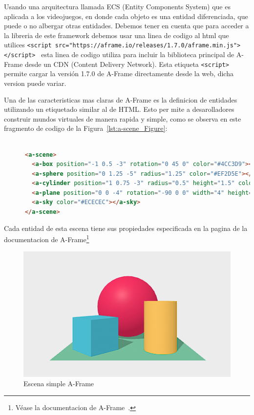 \documentclass[a4paper, 12pt]{book}
\begin{document}
Usando una arquitectura llamada ECS (Entity Components System) que es aplicada a los videojuegos, en donde cada objeto es una entidad diferenciada, que puede o no albergar otras entidades. Debemos tener en cuenta que para acceder a la libreria de este framework debemos usar una linea de codigo al html que utilices \texttt{<script src="https://aframe.io/releases/1.7.0/aframe.min.js"></script>
}
esta linea de codigo utiliza para incluir la biblioteca principal de A-Frame desde un CDN (Content Delivery Network). Esta etiqueta \texttt{<script>} permite cargar la versión 1.7.0 de A-Frame directamente desde la web, dicha version puede variar.

Una de las caracteristicas mas claras de A-Frame es la definicion de entidades utilizando un etiquetado similar al de HTML. Esto per mite a desarolladores construir mundos virtuales de manera rapida y simple, como se observa en este fragmento de codigo de la Figura~\ref{lst:a-scene_Figure}: 

\begin{lstlisting}[language=HTML, caption=Escena A-Frame básica, captionpos=b,label=lst:a-scene_Figure]

      <a-scene>
        <a-box position="-1 0.5 -3" rotation="0 45 0" color="#4CC3D9"></a-box>
        <a-sphere position="0 1.25 -5" radius="1.25" color="#EF2D5E"></a-sphere>
        <a-cylinder position="1 0.75 -3" radius="0.5" height="1.5" color="#FFC65D"></a-cylinder>
        <a-plane position="0 0 -4" rotation="-90 0 0" width="4" height="4" color="#7BC8A4"></a-plane>
        <a-sky color="#ECECEC"></a-sky>
      </a-scene>
\end{lstlisting}

Cada entidad de esta escena tiene sus propiedades especificada en la pagina de la documentacion de A-Frame\footnote{Véase la documentacion de A-Frame~\cite{aframe2025docs}.}

\begin{figure}[H]
    \centering
    \includegraphics[width=0.5\linewidth]{img/SceneSimple.png}
    \caption{Escena simple A-Frame}
    \label{fig:aframe-scene}
\end{figure}
\end{document}
